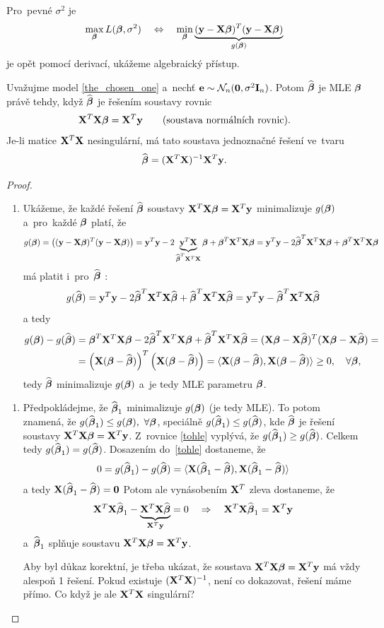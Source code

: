  Pro~pevné $\sigma^2$ je
 $$ \max_{\betab} L(\betab,\sigma^2)\quad\Leftrightarrow\quad\min_{\betab}\underbrace{(\y-\X\betab)^T(\y-\X\betab)}_{g(\betab)} $$
 je opět pomocí derivací, ukážeme algebraický přístup.

\newpage
 \begin{theorem}
 	Uvažujme model \eqref{the_chosen_one} a~nechť $\eb\sim\NN_n(\nula,\sigma^2 \In)$. Potom $\wbetab$ je MLE $\betab$ právě tehdy, když $\wbetab$ je řešením soustavy rovnic
 	 $$ \X^T\X\betab = \X^T\y\qquad\text{(soustava normálních rovnic)}. $$
 	Je-li matice $\X^T\X$ nesingulární, má tato soustava jednoznačné řešení ve~tvaru
 	 $$ \wbetab = (\X^T\X)^{-1}\X^T\y. $$
 	\begin{proof}
 		\begin{enumerate}[$\Leftarrow$]
 			\item Ukážeme, že každé řešení $\wbetab$ soustavy $\X^T\X\betab = \X^T\y$ minimalizuje $g(\betab)$ a~pro~každé $\betab$ platí, že
 			 $$ g(\bbeta) = \left((\y-\X\betab)^T(\y-\X\betab)\right) = \y^T\y-2\underbrace{\y^T\X}_{\wbetab^T\X^T\X}\betab+\betab^T\X^T\X\betab = \y^T\y-2\wbetab^T\X^T\X\betab+\betab^T\X^T\X\betab $$
 			má platit i~pro~$\wbetab$ :
 			 $$ g(\wbetab) = \y^T\y-2\wbetab^T\X^T\X\wbetab+\wbetab^T\X^T\X\wbetab = \y^T\y-\wbetab^T\X^T\X\wbetab $$
 			a tedy
 			\begin{align}
 			g(\bbeta)-g(\wbetab)& = \betab^T\X^T\X\betab-2\wbetab^T\X^T\X\betab+\wbetab^T\X^T\X\wbetab = (\X\betab-\X\wbetab)^T(\X\betab-\X\wbetab) = \\
 			&= \left(\X(\betab-\wbetab) \right)^T\left(\X(\betab-\wbetab) \right) = \langle \X(\betab-\wbetab),\X(\betab-\wbetab) \rangle\geq 0,\quad\forall\betab, \label{tohle}
 			\end{align}
 			 tedy $\wbetab$ minimalizuje $g(\bbeta)$ a~je tedy MLE parametru $\betab$.
 		\end{enumerate}
 	\begin{enumerate}[$\Rightarrow$]
 		\item Předpokládejme, že $\wbetab_1$ minimalizuje $g(\betab)$ (je tedy MLE). To potom znamená, že \linebreak $g(\wbetab_1)\leq g(\betab),~\forall \betab$, speciálně $g(\wbetab_1)\leq g(\wbetab)$, kde $\wbetab$ je řešení soustavy $\X^T\X\betab = \X^T\y$. Z~rovnice \eqref{tohle} vyplývá, že $g(\wbetab_1)\geq g(\wbetab)$. Celkem tedy $g(\wbetab_1) = g(\wbetab)$. Dosazením do~\eqref{tohle} dostaneme, že
 		 $$ 0 = g(\wbetab_1)-g(\wbetab) = \langle \X(\wbetab_1-\wbetab),\X(\wbetab_1-\wbetab) \rangle $$
 		a tedy $\X(\wbetab_1-\wbetab) = \nula$ Potom ale vynásobením $\X^T$ zleva dostaneme, že
 		 $$ \X^T\X\wbetab_1 - \underbrace{\X^T\X\wbetab}_{\X^T\y} = 0\quad\Rightarrow\quad \X^T\X\wbetab_1 = \X^T\y $$
 		 a~$\wbetab_1$ splňuje soustavu $\X^T\X\betab = \X^T\y$.
 		
 		Aby byl důkaz korektní, je třeba ukázat, že soustava $\X^T\X\betab = \X^T\y$ má vždy alespoň 1 řešení. Pokud existuje $(\X^T\X)^{-1}$, není co dokazovat, řešení máme přímo. Co když je ale $\X^T\X$ singulární?
 	\end{enumerate}
 	\end{proof}
 \end{theorem}
